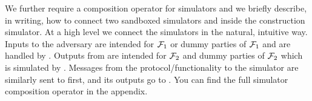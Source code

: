 We further require a composition operator for simulators and we briefly describe, in writing, how to connect two sandboxed simulators \SIM{\rho} and \SIM{\pi} inside the construction simulator.
At a high level we connect the simulators in the natural, intuitive way.
Inputs to the adversary are intended for $\mathcal{F}_1$ or dummy parties of $\mathcal{F}_1$ and are handled by \SIM{\pi}. Outputs from \SIM{\pi} are intended for $\mathcal{F}_2$ and dummy parties of $\mathcal{F}_2$ which is simulated by \SIM{\rho}.
Messages from the protocol/functionality to the simulator are similarly sent to \SIM{\rho} first, and its outputs go to \SIM{\pi}.
You can find the full simulator composition operator in the appendix.

